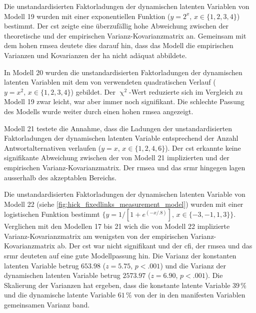 \documentclass[11pt, twoside, a4paper]{book}		%
\begin{document}
Die unstandardisierten Faktorladungen der dynamischen latenten Variablen von Modell 19 wurden mit einer exponentiellen Funktion ($y=2^x,\,x\in\{1, 2, 3, 4\}$) bestimmt. Der \gls{cst} zeigte eine überzufällig hohe Abweichung zwischen der theoretische und der empirischen Var\-ianz-Ko\-var\-ianz\-ma\-trix an. Gemeinsam mit dem hohen \gls{rmsea} deutete dies darauf hin, dass das Modell die empirischen Varianzen und Kovarianzen der \gls{ha} nicht adäquat abbildete.

In Modell 20 wurden die unstandardisierten Faktorladungen der dynamischen latenten Variablen mit dem von \citet{Schweizer2006a} verwendeten quadratischen Verlauf ($y=x^2,\,x\in\{1, 2, 3, 4\}$) gebildet. Der $\upchi^2$-Wert reduzierte sich im Vergleich zu Modell 19 zwar leicht, war aber immer noch signifikant. Die schlechte Passung des Modells wurde weiter durch einen hohen \gls{rmsea} angezeigt.

Modell 21 testete die Annahme, dass die Ladungen der unstandardisierten Faktorladungen der dynamischen latenten Variable entsprechend der Anzahl Antwortalternativen verlaufen ($y=x,\,x\in\{1, 2, 4, 6\}$). Der \gls{cst} erkannte keine signifikante Abweichung zwischen der von Modell 21 implizierten und der empirischen Var\-ianz-Ko\-var\-ianz\-ma\-trix. Der \gls{rmsea} und das \gls{srmr} hingegen lagen ausserhalb des akzeptablen Bereichs.

Die unstandardisierten Faktorladungen der dynamischen latenten Variable von Modell 22 (siehe \autoref{fig:hick_fixedlinks_measurement_model}) wurden mit einer logistischen Funktion bestimmt $\{y={1}/[{1 + e^{(-x/.8)}}],\,x\in\{-3,-1,1,3\}\}$. Verglichen mit den Modellen 17 bis 21 wich die von Modell 22 implizierte Var\-ianz-Ko\-var\-ianz\-ma\-trix am wenigsten von der empirischen Var\-ianz-Ko\-var\-ianz\-ma\-trix ab. Der \gls{cst} war nicht signifikant und der \gls{cfi}, der \gls{rmsea} und das \gls{srmr} deuteten auf eine gute Modellpassung hin. 
Die Varianz der konstanten latenten Variable betrug $653.98$ ($z=5.75$, $p<.001$) und die Varianz der dynamischen latenten Variable betrug $2573.97$ ($z=6.90$, $p<.001$). Die Skalierung der Varianzen \citep{Schweizer2011a} hat ergeben, dass die konstante latente Variable $39\,\%$ und die dynamische latente Variable $61\,\%$ von der in den manifesten Variablen gemeinsamen Varianz band.
\end{document}
